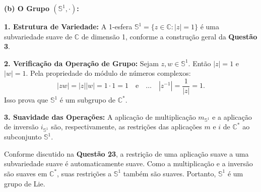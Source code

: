 {	\vspace{10pt}
	\textbf{(b) O Grupo $(\mathbb{S}^1, \cdot)$:}
	
	\textbf{1. Estrutura de Variedade:}
	A 1-esfera $\mathbb{S}^1 = \{ z \in \mathbb{C} : |z| = 1 \}$ é uma subvariedade suave de $\mathbb{C}$ de dimensão 1, conforme a construção geral da \textbf{Questão 3}.
	
	\textbf{2. Verificação da Operação de Grupo:}
	Sejam $z, w \in \mathbb{S}^1$. Então $|z| = 1$ e $|w| = 1$. Pela propriedade do módulo de números complexos:
	\begin{equation*}
		|zw| = |z||w| = 1 \cdot 1 = 1 \quad \text{e} \quad \dots \quad |z^{-1}| = \frac{1}{|z|} = 1.
	\end{equation*}
	Isso prova que $\mathbb{S}^1$ é um subgrupo de $\mathbb{C}^*$.
	
	\textbf{3. Suavidade das Operações:}
	A aplicação de multiplicação $m_{\mathbb{S}^1}$ e a aplicação de inversão $i_{\mathbb{S}^1}$ são, respectivamente, as restrições das aplicações $m$ e $i$ de $\mathbb{C}^*$ ao subconjunto $\mathbb{S}^1$.
	
	Conforme discutido na \textbf{Questão 23}, a restrição de uma aplicação suave a uma subvariedade suave é automaticamente suave. Como a multiplicação e a inversão são suaves em $\mathbb{C}^*$, suas restrições a $\mathbb{S}^1$ também são suaves. Portanto, $\mathbb{S}^1$ é um grupo de Lie.
}
